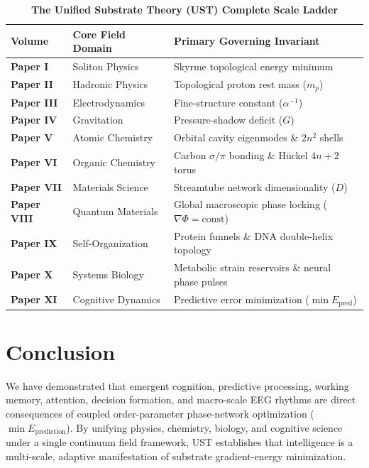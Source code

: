 \documentclass[11pt,a4paper]{article}
\begin{document}
	\begin{table}[htbp]
		\centering
		\caption{\textbf{The Unified Substrate Theory (UST) Complete Scale Ladder}}
		\begin{tabular}{lll}
			\toprule
			\textbf{Volume} & \textbf{Core Field Domain} & \textbf{Primary Governing Invariant} \\
			\midrule
			\textbf{Paper I} & Soliton Physics & Skyrme topological energy minimum \\
			\textbf{Paper II} & Hadronic Physics & Topological proton rest mass ($m_p$) \\
			\textbf{Paper III} & Electrodynamics & Fine-structure constant ($\alpha^{-1}$) \\
			\textbf{Paper IV} & Gravitation & Pressure-shadow deficit ($G$) \\
			\textbf{Paper V} & Atomic Chemistry & Orbital cavity eigenmodes \& $2n^2$ shells \\
			\textbf{Paper VI} & Organic Chemistry & Carbon $\sigma/\pi$ bonding \& Hückel $4n+2$ torus \\
			\textbf{Paper VII} & Materials Science & Streamtube network dimensionality ($D$) \\
			\textbf{Paper VIII} & Quantum Materials & Global macroscopic phase locking ($\nabla \Phi = \text{const}$) \\
			\textbf{Paper IX} & Self-Organization & Protein funnels \& DNA double-helix topology \\
			\textbf{Paper X} & Systems Biology & Metabolic strain reservoirs \& neural phase pulses \\
			\textbf{Paper XI} & Cognitive Dynamics & Predictive error minimization ($\min E_{\text{pred}}$) \\
			\bottomrule
		\end{tabular}
		\label{tab:ust_eleven_paper_summary}
	\end{table}
	
	\section{Conclusion}
	\label{sec:conclusion}
	
	We have demonstrated that emergent cognition, predictive processing, working memory, attention, decision formation, and macro-scale EEG rhythms are direct consequences of coupled order-parameter phase-network optimization ($\min E_{\text{prediction}}$). By unifying physics, chemistry, biology, and cognitive science under a single continuum field framework, UST establishes that intelligence is a multi-scale, adaptive manifestation of substrate gradient-energy minimization.
	
\end{document}
